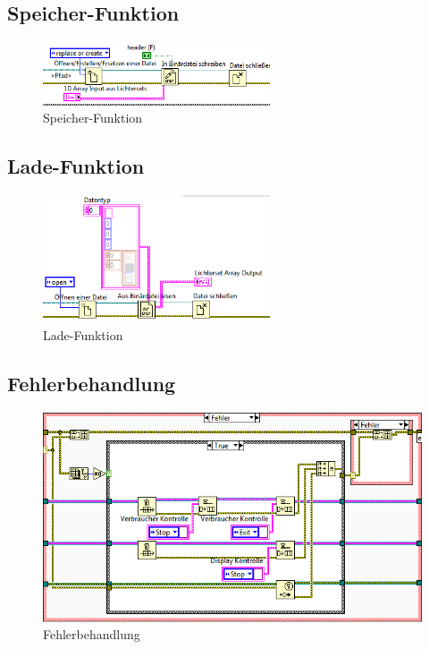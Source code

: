 	\subsection{Speicher-Funktion}
	\begin{figure}[!h]
	\centering
		\includegraphics[width=0.6\textwidth]{Pics/speichern.png}
	\caption{Speicher-Funktion}
	\label{fig:a11}
	\end{figure}
	
	\subsection{Lade-Funktion}
	\begin{figure}[!h]
	\centering
		\includegraphics[width=0.6\textwidth]{Pics/laden.png}
	\caption{Lade-Funktion}
	\label{fig:a12}
	\end{figure}
	
	\subsection{Fehlerbehandlung}
	\begin{figure}[!h]
	\centering
		\includegraphics[width=\textwidth]{Pics/fehler.png}
	\caption{Fehlerbehandlung}
	\label{fig:a13}
	\end{figure}
	\newpage
	
